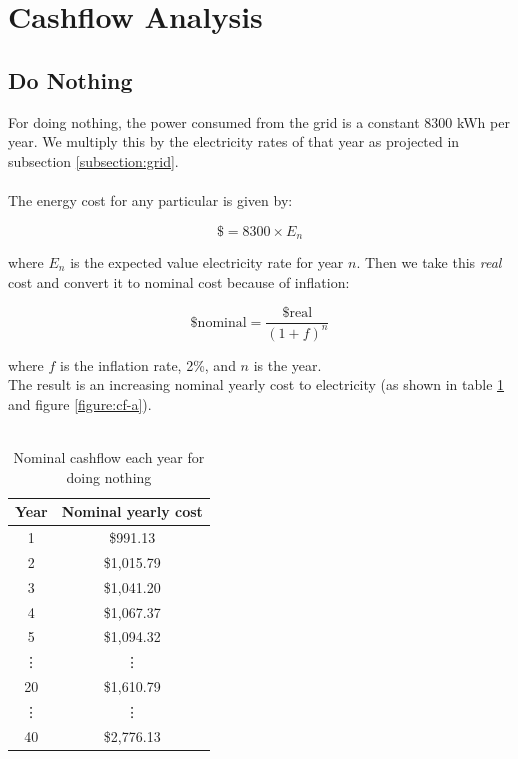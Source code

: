 \documentclass[10pt,letterpaper]{article}
\begin{document}
\section{Cashflow Analysis}

\subsection{Do Nothing}

For doing nothing, the power consumed from the grid is a constant 8300 kWh per year. We multiply this by the electricity rates of that year as projected in subsection \ref{subsection:grid}.\\
\\
The energy cost for any particular is given by:

\begin{equation}
	\$=8300\times E_n
\end{equation}

where $E_n$ is the expected value electricity rate for year $n$. Then we take this \textit{real} cost and convert it to nominal cost because of inflation:

\begin{equation}
	\text{\$ nominal}=\frac{\text{\$ real}}{(1+f)^n}
\end{equation}

where $f$ is the inflation rate, 2\%, and $n$ is the year.\\

The result is an increasing nominal yearly cost to electricity (as shown in table \ref{table:cf-nothing-cf} and figure \ref{figure:cf-a}).\\
\\
\begin{table}[H]
	\centering
	\begin{tabular}{|c|c|}
		\hline
		Year&Nominal yearly cost\\
		\hline
		1&\$991.13\\
		2&\$1,015.79\\
		3&\$1,041.20\\
		4&\$1,067.37\\
		5&\$1,094.32\\
		\vdots&\vdots\\
		20&\$1,610.79\\
		\vdots&\vdots\\
		40&\$2,776.13\\
		\hline
	\end{tabular}
	\caption{Nominal cashflow each year for doing nothing}
	\label{table:cf-nothing-cf}
\end{table}
\end{document}
